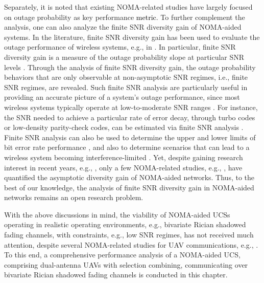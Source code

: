 Separately, it is noted that existing NOMA-related studies have largely focused on outage probability as key performance \textcolor{black}{metric}. To further complement the analysis, one can also analyze the finite SNR diversity gain of NOMA-aided systems. In the literature, finite SNR diversity gain has been used to evaluate the outage performance of wireless systems, e.g., in \cite{tan2018joint,narasimhan2006finite,shin2008diversity,ernest2019outage}. In particular, finite SNR diversity gain is a measure of the outage probability slope at particular SNR levels \cite{shin2008diversity}. Through the analysis of finite SNR diversity gain, the outage probability behaviors that are only observable at non-asymptotic SNR regimes, i.e., finite SNR regimes, are revealed. Such finite SNR analysis are particularly useful in providing an accurate picture of a system's outage performance, since most wireless systems typically operate at low-to-moderate SNR ranges \cite{ernest2019outage}. For instance, the SNR needed to achieve a particular rate of error decay, through turbo codes or low-density parity-check codes, can be estimated via finite SNR analysis \cite{narasimhan2006finite}. Finite SNR analysis can also be used to determine the upper and lower limits of bit error rate performance \cite{zheng2003diversity,nabar2005diversity}, and also to determine scenarios that can lead to a wireless system becoming interference-limited \cite{tan2018joint,ernest2019outage}. Yet, despite gaining research interest in recent years, e.g., \cite{tan2018joint,ernest2019outage,yang2015efficient,heidarpour2017finite}, only a few NOMA-related studies, e.g., \cite{yang2016general,hou2018outage}, have quantified the asymptotic diversity gain of NOMA-aided networks. Thus, to the best of our knowledge, the analysis of finite SNR diversity gain in NOMA-aided networks remains an open research problem.

With the above discussions in mind, the viability of NOMA-aided UCSs operating in realistic operating environments, e.g., bivariate Rician shadowed fading channels, with constraints, e.g., low SNR regimes, has not received much attention, despite several NOMA-related studies for UAV communications, e.g., \cite{hou2018multiple,mei2019uplink,zhao2019joint}. To this end, a comprehensive performance analysis of a NOMA-aided UCS, comprising dual-antenna UAVs with selection combining, communicating over bivariate Rician shadowed fading channels is conducted in this chapter.

